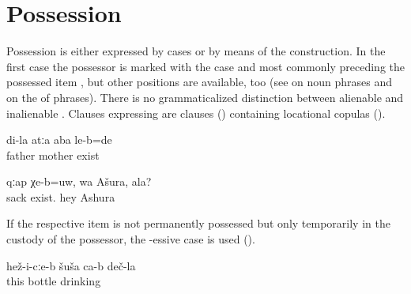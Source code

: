 
\section{Possession}
\label{sec:Possession}

Possession is either expressed by cases or by means of the  construction. In the first case the possessor is marked with the  case and most commonly preceding the possessed item , but other positions are available, too  (see  on noun phrases and  on the  of phrases). There is no grammaticalized distinction between alienable and inalienable . Clauses expressing  are  clauses () containing locational copulas ().
%
\begin{exe}
	\ex	\label{ex:I had mother and father}
	\gll	di-la	atːa	aba	le-b=de\\
			father	mother	exist\\
	\glt	{}

	\ex	\label{ex:‎Is your sack there, Ashura}
	\gll	qːap	χe-b=uw,	wa	Ašura,		ala?\\
		sack	exist.	hey	Ashura		\\
	\glt	{}
\end{exe}

If the respective item is not permanently possessed but only temporarily in the custody of the possessor, the -essive case is used  ().
%
\begin{exe}
	\ex	\label{ex:‎‎He has a bottle with a drink}
	\gll	hež-i-cːe-b	šuša	ca-b	deč-la\\
		this	bottle		drinking\\
	\glt	{}
\end{exe}

